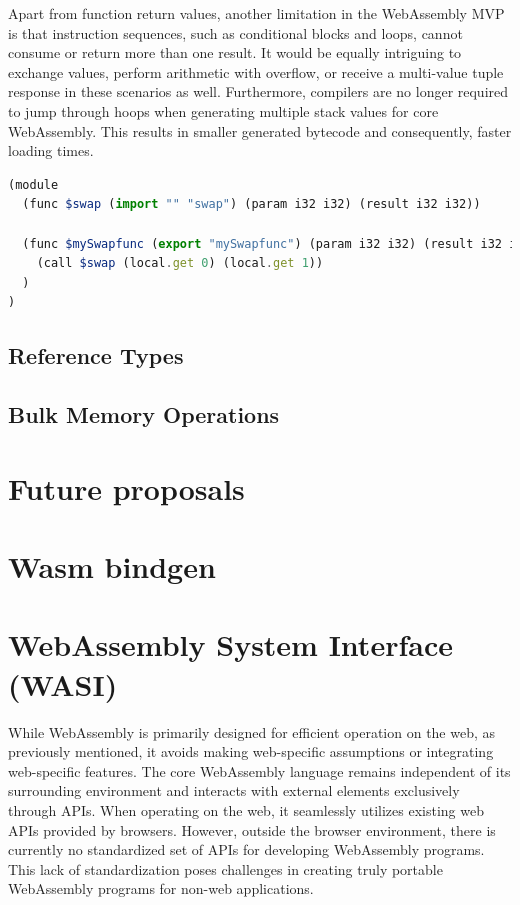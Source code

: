 Apart from function return values, another limitation in the WebAssembly MVP is that instruction sequences, such as conditional blocks and loops, cannot consume or return more than one result. It would be equally intriguing to exchange values, perform arithmetic with overflow, or receive a multi-value tuple response in these scenarios as well. Furthermore, compilers are no longer required to jump through hoops when generating multiple stack values for core WebAssembly. This results in smaller generated bytecode and consequently, faster loading times.

\begin{lstlisting}[frame=lines, caption=Simple swap function that evaluates the multi return proposal, captionpos=b, language=JavaScript, showstringspaces=false]
(module
  (func $swap (import "" "swap") (param i32 i32) (result i32 i32))

  (func $mySwapfunc (export "mySwapfunc") (param i32 i32) (result i32 i32)
    (call $swap (local.get 0) (local.get 1))
  )
)
\end{lstlisting}

\subsection{Reference Types}

\subsection{Bulk Memory Operations}


\section{Future proposals}
\label{sec:future-proposals}

\section{Wasm bindgen}
\label{sec:wasm-bindgen}

\section{WebAssembly System Interface (WASI)}
\label{sec:wasi}
While WebAssembly is primarily designed for efficient operation on the web, as previously mentioned, it avoids making web-specific assumptions or integrating web-specific features. The core WebAssembly language remains independent of its surrounding environment and interacts with external elements exclusively through APIs. When operating on the web, it seamlessly utilizes existing web APIs provided by browsers. However, outside the browser environment, there is currently no standardized set of APIs for developing WebAssembly programs. This lack of standardization poses challenges in creating truly portable WebAssembly programs for non-web applications.

